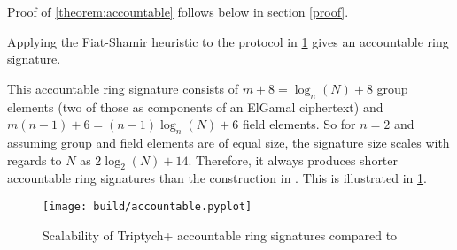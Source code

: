 Proof of \cref{theorem:accountable} follows below in section \ref{proof}.

Applying the Fiat-Shamir heuristic to the protocol in \cref{fig:accountable} gives an accountable ring signature.

This accountable ring signature consists of $m + 8 = \log_n(N) + 8$ group elements (two of those as components of an ElGamal ciphertext) and $m(n-1) + 6 = (n-1) \log_n(N) + 6$ field elements.
So for $n = 2$ and assuming group and field elements are of equal size, the signature size scales with regards to $N$ as $2 \log_2(N) + 14$.
Therefore, it always produces shorter accountable ring signatures than the construction in \cite{short_ring_signatures}.
This is illustrated in \cref{fig:accountable}.

\begin{figure}[h]
	\centering
	\texttt{[image: build/accountable.pyplot]}
	\caption{Scalability of Triptych+ accountable ring signatures compared to \cite{short_ring_signatures}}
	\label{fig:accountable}
\end{figure}

